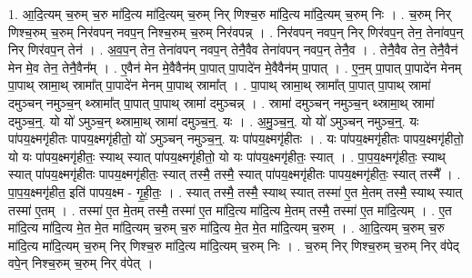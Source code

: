 \documentclass[17pt]{extarticle}
\begin{document}
1. आ॒दि॒त्यम् च॒रुम् च॒रु मा॑दि॒त्य मा॑दि॒त्यम् च॒रुम् निर् णिश्च॒रु मा॑दि॒त्य मा॑दि॒त्यम् च॒रुम् निः । . च॒रुम् निर् णिश्च॒रुम् च॒रुम् निर॑वपन् नवप॒न् निश्च॒रुम् च॒रुम् निर॑वपन्न् । . निर॑वपन् नवप॒न् निर् णिर॑वप॒न् तेन॒ तेना॑वप॒न् निर् णिर॑वप॒न् तेन॑ । . अ॒व॒प॒न् तेन॒ तेना॑वपन् नवप॒न् तेनै॒वैव तेना॑वपन् नवप॒न् तेनै॒व । . तेनै॒वैव तेन॒ तेनै॒वैन॑ मेन मे॒व तेन॒ तेनै॒वैन᳚म् । . ए॒वैन॑ मेन मे॒वैवैन॑म् पा॒पात् पा॒पादे॑न मे॒वैवैन॑म् पा॒पात् । . ए॒न॒म् पा॒पात् पा॒पादे॑न मेनम् पा॒पाथ् स्रामा॒थ् स्रामा᳚त् पा॒पादे॑न मेनम् पा॒पाथ् स्रामा᳚त् । . पा॒पाथ् स्रामा॒थ् स्रामा᳚त् पा॒पात् पा॒पाथ् स्रामा॑ दमुञ्चन् नमुञ्च॒न् थ्स्रामा᳚त् पा॒पात् पा॒पाथ् स्रामा॑ दमुञ्चन्न् । . स्रामा॑ दमुञ्चन् नमुञ्च॒न् थ्स्रामा॒थ् स्रामा॑ दमुञ्च॒न्॒. यो यो॑ ऽमुञ्च॒न् थ्स्रामा॒थ् स्रामा॑ दमुञ्च॒न्॒. यः । . अ॒मु॒ञ्च॒न्॒. यो यो॑ ऽमुञ्चन् नमुञ्च॒न्॒. यः पा॑पय॒क्ष्मगृ॑हीतः पापय॒क्ष्मगृ॑हीतो॒ यो॑ ऽमुञ्चन् नमुञ्च॒न्॒. यः पा॑पय॒क्ष्मगृ॑हीतः । . यः पा॑पय॒क्ष्मगृ॑हीतः पापय॒क्ष्मगृ॑हीतो॒ यो यः पा॑पय॒क्ष्मगृ॑हीतः॒ स्याथ् स्यात् पा॑पय॒क्ष्मगृ॑हीतो॒ यो यः पा॑पय॒क्ष्मगृ॑हीतः॒ स्यात् । . पा॒प॒य॒क्ष्मगृ॑हीतः॒ स्याथ् स्यात् पा॑पय॒क्ष्मगृ॑हीतः पापय॒क्ष्मगृ॑हीतः॒ स्यात् तस्मै॒ तस्मै॒ स्यात् पा॑पय॒क्ष्मगृ॑हीतः पापय॒क्ष्मगृ॑हीतः॒ स्यात् तस्मै᳚ । . पा॒प॒य॒क्ष्मगृ॑हीत॒ इति॑ पापय॒क्ष्म - गृ॒ही॒तः॒ । . स्यात् तस्मै॒ तस्मै॒ स्याथ् स्यात् तस्मा॑ ए॒त मे॒तम् तस्मै॒ स्याथ् स्यात् तस्मा॑ ए॒तम् । . तस्मा॑ ए॒त मे॒तम् तस्मै॒ तस्मा॑ ए॒त मा॑दि॒त्य मा॑दि॒त्य मे॒तम् तस्मै॒ तस्मा॑ ए॒त मा॑दि॒त्यम् । . ए॒त मा॑दि॒त्य मा॑दि॒त्य मे॒त मे॒त मा॑दि॒त्यम् च॒रुम् च॒रु मा॑दि॒त्य मे॒त मे॒त मा॑दि॒त्यम् च॒रुम् । . आ॒दि॒त्यम् च॒रुम् च॒रु मा॑दि॒त्य मा॑दि॒त्यम् च॒रुम् निर् णिश्च॒रु मा॑दि॒त्य मा॑दि॒त्यम् च॒रुम् निः । . च॒रुम् निर् णिश्च॒रुम् च॒रुम् निर् व॑पेद् वपे॒न् निश्च॒रुम् च॒रुम् निर् व॑पेत् । \newline
\end{document}
